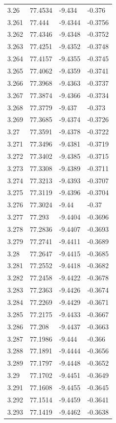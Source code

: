 \begin{tabular}{llll}
3.26 & 77.4534 & -9.434 & -0.376 \\
3.261 & 77.444 & -9.4344 & -0.3756 \\
3.262 & 77.4346 & -9.4348 & -0.3752 \\
3.263 & 77.4251 & -9.4352 & -0.3748 \\
3.264 & 77.4157 & -9.4355 & -0.3745 \\
3.265 & 77.4062 & -9.4359 & -0.3741 \\
3.266 & 77.3968 & -9.4363 & -0.3737 \\
3.267 & 77.3874 & -9.4366 & -0.3734 \\
3.268 & 77.3779 & -9.437 & -0.373 \\
3.269 & 77.3685 & -9.4374 & -0.3726 \\
3.27 & 77.3591 & -9.4378 & -0.3722 \\
3.271 & 77.3496 & -9.4381 & -0.3719 \\
3.272 & 77.3402 & -9.4385 & -0.3715 \\
3.273 & 77.3308 & -9.4389 & -0.3711 \\
3.274 & 77.3213 & -9.4393 & -0.3707 \\
3.275 & 77.3119 & -9.4396 & -0.3704 \\
3.276 & 77.3024 & -9.44 & -0.37 \\
3.277 & 77.293 & -9.4404 & -0.3696 \\
3.278 & 77.2836 & -9.4407 & -0.3693 \\
3.279 & 77.2741 & -9.4411 & -0.3689 \\
3.28 & 77.2647 & -9.4415 & -0.3685 \\
3.281 & 77.2552 & -9.4418 & -0.3682 \\
3.282 & 77.2458 & -9.4422 & -0.3678 \\
3.283 & 77.2363 & -9.4426 & -0.3674 \\
3.284 & 77.2269 & -9.4429 & -0.3671 \\
3.285 & 77.2175 & -9.4433 & -0.3667 \\
3.286 & 77.208 & -9.4437 & -0.3663 \\
3.287 & 77.1986 & -9.444 & -0.366 \\
3.288 & 77.1891 & -9.4444 & -0.3656 \\
3.289 & 77.1797 & -9.4448 & -0.3652 \\
3.29 & 77.1702 & -9.4451 & -0.3649 \\
3.291 & 77.1608 & -9.4455 & -0.3645 \\
3.292 & 77.1514 & -9.4459 & -0.3641 \\
3.293 & 77.1419 & -9.4462 & -0.3638 \\

\end{tabular}
